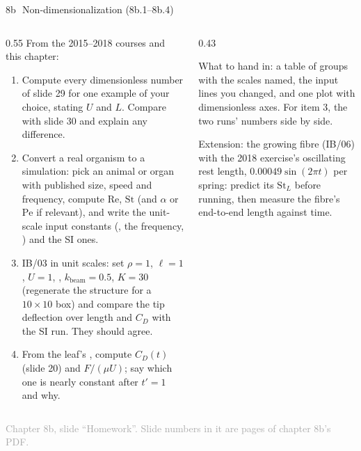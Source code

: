 \documentclass[aspectratio=169,11pt]{beamer}
\newcommand{\sourcecredit}[1]{\vfill\begin{flushright}\tiny\textcolor{DarkGray}{#1}\end{flushright}}
\begin{document}
\begin{frame}{8b\,\textbullet\ Non-dimensionalization (8b.1--8b.4)}
\label{fr:c8bx1}
\begin{columns}[T,onlytextwidth]
\begin{column}{0.55\textwidth}
\footnotesize From the 2015--2018 courses and this chapter:
\begin{enumerate}
  \item[8b.1] Compute every dimensionless number of slide 29 for one example of your choice, stating $U$ and $L$. Compare with slide 30 and explain any difference.
  \item[8b.2] Convert a real organism to a simulation: pick an animal or organ with published size, speed and frequency, compute $\mathrm{Re}$, $\mathrm{St}$ (and $\alpha$ or $\mathrm{Pe}$ if relevant), and write the unit-scale input constants (, the frequency, ) and the SI ones.
  \item[8b.3] IB/03 in unit scales: set $\rho = 1$, $\ell = 1$, $U = 1$, , $k_{\mathrm{beam}} = 0.5$, $K = 30$ (regenerate the structure for a $10 \times 10$ box) and compare the tip deflection over length and $C_D$ with the SI run. They should agree.
  \item[8b.4] From the leaf's , compute $C_D(t)$ (slide 20) and $F/(\mu U)$; say which one is nearly constant after $t' = 1$ and why.
\end{enumerate}
\end{column}
\begin{column}{0.43\textwidth}
\begin{punchbox}
\footnotesize What to hand in: a table of groups with the scales named, the input lines you changed, and one plot with dimensionless axes. For item 3, the two runs' numbers side by side.
\end{punchbox}
\vspace{1mm}
\footnotesize {} Extension: the growing fibre (IB/06) with the 2018 exercise's oscillating rest length, $0.00049\sin(2\pi t)$ per spring: predict its $\mathrm{St}_L$ before running, then measure the fibre's end-to-end length against time.
\end{column}
\end{columns}
\sourcecredit{Chapter 8b, slide ``Homework''. Slide numbers in it are pages of chapter 8b's PDF.}
\end{frame}
\end{document}
